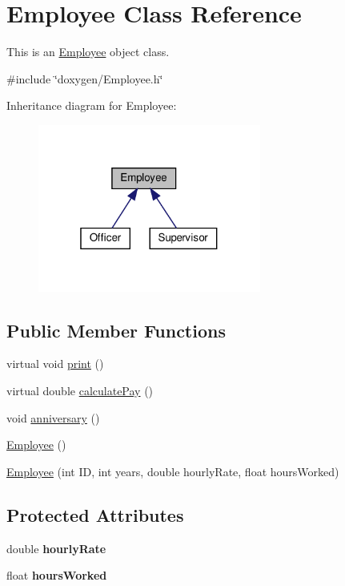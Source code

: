 \hypertarget{classEmployee}{}\section{Employee Class Reference}
\label{classEmployee}


This is an \hyperlink{classEmployee}{Employee} object class.  




{\ttfamily \#include \char`\"{}doxygen/\+Employee.\+h\char`\"{}}



Inheritance diagram for Employee\+:\nopagebreak
\begin{figure}[H]
\begin{center}
\leavevmode
\includegraphics[width=208pt]{classEmployee__inherit__graph}
\end{center}
\end{figure}
\subsection*{Public Member Functions}
\begin{DoxyCompactItemize}
\item 
virtual void \hyperlink{classEmployee_a79556ad700627dba88049f487a34a762}{print} ()
\item 
virtual double \hyperlink{classEmployee_a01c2c44e15434237db28832f6972e960}{calculate\+Pay} ()
\item 
void \hyperlink{classEmployee_a67c345031cf63f515fb09dc675dee5f3}{anniversary} ()
\item 
\hyperlink{classEmployee_a003c7bd08c40924e381eb0750cbb906f}{Employee} ()
\item 
\hyperlink{classEmployee_ad0c935ef9a290a82dcf7865172c90148}{Employee} (int ID, int years, double hourly\+Rate, float hours\+Worked)
\end{DoxyCompactItemize}
\subsection*{Protected Attributes}
\begin{DoxyCompactItemize}
\item 
\mbox{\label{classEmployee_ac31134abb9b4004fc015e51ef579b069}} 
double {\bfseries hourly\+Rate}
\item 
\mbox{\label{classEmployee_afde35c73d02eb1cfe89e23a80998b42e}} 
float {\bfseries hours\+Worked}
\end{DoxyCompactItemize}
